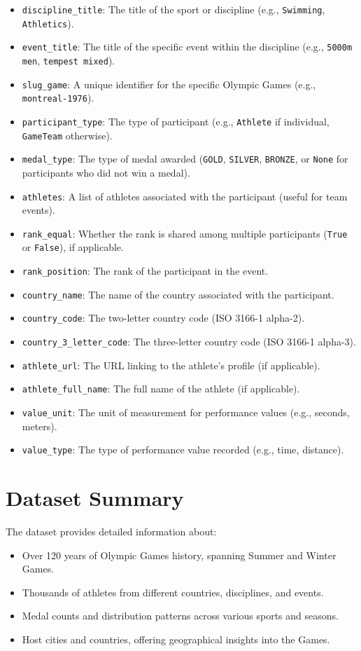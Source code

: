 \begin{itemize}
    \item \texttt{discipline\_title}: The title of the sport or discipline (e.g., \texttt{Swimming}, \texttt{Athletics}).
    \item \texttt{event\_title}: The title of the specific event within the discipline (e.g., \texttt{5000m men}, \texttt{tempest mixed}).
    \item \texttt{slug\_game}: A unique identifier for the specific Olympic Games (e.g., \texttt{montreal-1976}).
    \item \texttt{participant\_type}: The type of participant (e.g., \texttt{Athlete} if individual, \texttt{GameTeam} otherwise).
    \item \texttt{medal\_type}: The type of medal awarded (\texttt{GOLD}, \texttt{SILVER}, \texttt{BRONZE}, or \texttt{None} for participants who did not win a medal).
    \item \texttt{athletes}: A list of athletes associated with the participant (useful for team events).
    \item \texttt{rank\_equal}: Whether the rank is shared among multiple participants (\texttt{True} or \texttt{False}), if applicable.
    \item \texttt{rank\_position}: The rank of the participant in the event.
    \item \texttt{country\_name}: The name of the country associated with the participant.
    \item \texttt{country\_code}: The two-letter country code (ISO 3166-1 alpha-2).
    \item \texttt{country\_3\_letter\_code}: The three-letter country code (ISO 3166-1 alpha-3).
    \item \texttt{athlete\_url}: The URL linking to the athlete's profile (if applicable).
    \item \texttt{athlete\_full\_name}: The full name of the athlete (if applicable).
    \item \texttt{value\_unit}: The unit of measurement for performance values (e.g., seconds, meters).
    \item \texttt{value\_type}: The type of performance value recorded (e.g., time, distance).
\end{itemize}

\section{Dataset Summary}

The dataset provides detailed information about:
\begin{itemize}
    \item Over 120 years of Olympic Games history, spanning Summer and Winter Games.
    \item Thousands of athletes from different countries, disciplines, and events.
    \item Medal counts and distribution patterns across various sports and seasons.
    \item Host cities and countries, offering geographical insights into the Games.
\end{itemize}
